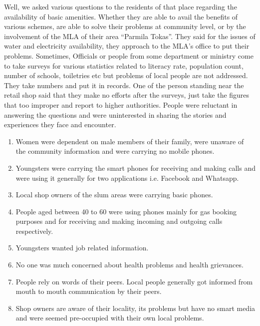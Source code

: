\begin{enumerate}
Well, we asked various questions to the residents of that place regarding the
availability of basic amenities. Whether they are able to avail the benefits of various
schemes, are able to solve their problems at community level, or by the involvement
of the MLA of their area “Parmila Tokas”. They said for the issues of water and
electricity availability, they approach to the MLA’s office to put their problems.
Sometimes, Officials or people from some department or ministry come to take
surveys for various statistics related to literacy rate, population count, number of
schools, toiletries etc but problems of local people are not addressed. They take
numbers and put it in records. One of the person standing near the retail shop said
that they make no efforts after the surveys, just take the figures that too improper
and report to higher authorities. People were reluctant in answering the questions and were uninterested in sharing
the stories and experiences they face and encounter.

\begin{enumerate}
\item  Women were dependent on male members of their family, were unaware of the community information and were carrying no mobile phones.
\item Youngsters were carrying the smart phones for receiving and making calls
and were using it generally for two applications i.e. Facebook and Whatsapp.
\item Local shop owners of the slum areas were carrying basic phones.
\item People aged between 40 to 60 were using phones mainly for gas booking
purposes and for receiving and making incoming and outgoing calls
respectively.
\item Youngsters wanted job related information.
\item No one was much concerned about health problems and health grievances.
\item People rely on words of their peers. Local people generally got informed from
mouth to mouth communication by their peers.
\item Shop owners are aware of their locality, its problems but have no smart
media and were seemed pre-occupied with their own local problems.
\end{enumerate}



\end{enumerate}

